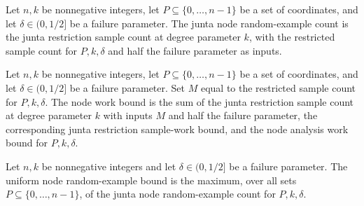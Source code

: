 \begin{definition}
\label{FABL.lowDegreeJuntaNodeRandomExamples}
\leanok
{}
Let $n,k$ be nonnegative integers, let $P\subseteq\{0,\ldots,n-1\}$ be a set of
coordinates, and let $\delta\in(0,1/2]$ be a failure parameter. The junta node
random-example count is the junta restriction sample count at degree parameter $k$, with
the restricted sample count for $P,k,\delta$ and half the failure parameter as inputs.
\end{definition}

\begin{definition}
\label{FABL.lowDegreeJuntaNodeWorkBound}
\leanok
{}
Let $n,k$ be nonnegative integers, let $P\subseteq\{0,\ldots,n-1\}$ be a set of
coordinates, and let $\delta\in(0,1/2]$ be a failure parameter. Set $M$ equal to the
restricted sample count for $P,k,\delta$. The node work bound is the sum of the junta
restriction sample count at degree parameter $k$ with inputs $M$ and half the failure
parameter, the corresponding junta restriction sample-work bound, and the node analysis
work bound for $P,k,\delta$.
\end{definition}

\begin{definition}
\label{FABL.lowDegreeJuntaNodeRandomExampleBound}
\leanok
{}
Let $n,k$ be nonnegative integers and let $\delta\in(0,1/2]$ be a failure parameter. The
uniform node random-example bound is the maximum, over all sets
$P\subseteq\{0,\ldots,n-1\}$, of the junta node random-example count for $P,k,\delta$.
\end{definition}

